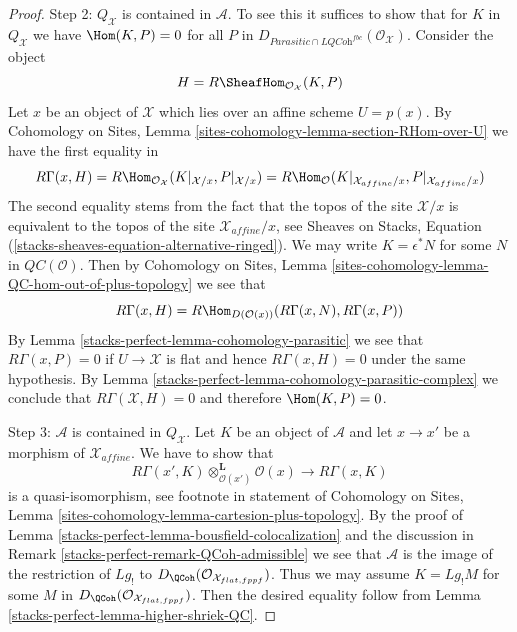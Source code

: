\begin{proof}
\medskip\noindent
Step 2: $Q_\mathcal{X}$ is contained in $\mathcal{A}$.
To see this it suffices to show that for $K$ in $Q_\mathcal{X}$
we have $\Hom(K, P) = 0$ for all $P$ in
$D_{\textit{Parasitic} \cap \textit{LQCoh}^{fbc}}(\mathcal{O}_\mathcal{X})$.
Consider the object
$$
H = R\SheafHom_{\mathcal{O}_\mathcal{X}}(K, P)
$$
Let $x$ be an object of $\mathcal{X}$ which lies over an affine scheme
$U = p(x)$. By Cohomology on Sites, Lemma
\ref{sites-cohomology-lemma-section-RHom-over-U} we have
the first equality in
$$
R\Gamma(x, H) =
R\Hom_{\mathcal{O}_\mathcal{X}}(K|_{\mathcal{X}/x}, P|_{\mathcal{X}/x}) =
R\Hom_{\mathcal{O}}(K|_{\mathcal{X}_{affine}/x}, P|_{\mathcal{X}_{affine}/x})
$$
The second equality stems from the fact that the topos of the site
$\mathcal{X}/x$ is equivalent to the topos of the site
$\mathcal{X}_{affine}/x$, see Sheaves on Stacks, Equation
(\ref{stacks-sheaves-equation-alternative-ringed}).
We may write $K = \epsilon^*N$ for some $N$ in $\mathit{QC}(\mathcal{O})$.
Then by Cohomology on Sites, Lemma
\ref{sites-cohomology-lemma-QC-hom-out-of-plus-topology} we see
that
$$
R\Gamma(x, H) =
R\Hom_{D(\mathcal{O}(x))}(R\Gamma(x, N), R\Gamma(x, P))
$$
By Lemma \ref{stacks-perfect-lemma-cohomology-parasitic} we see that $R\Gamma(x, P) = 0$
if $U \to \mathcal{X}$ is flat and hence $R\Gamma(x, H) = 0$ under the same
hypothesis. By Lemma \ref{stacks-perfect-lemma-cohomology-parasitic-complex} we conclude that
$R\Gamma(\mathcal{X}, H) = 0$ and therefore $\Hom(K, P) = 0$.

\medskip\noindent
Step 3: $\mathcal{A}$ is contained in $Q_\mathcal{X}$.
Let $K$ be an object of $\mathcal{A}$ and let $x \to x'$
be a morphism of $\mathcal{X}_{affine}$. We have to show that
$$
R\Gamma(x', K) \otimes_{\mathcal{O}(x')}^\mathbf{L} \mathcal{O}(x)
\longrightarrow
R\Gamma(x, K)
$$
is a quasi-isomorphism, see footnote in statement of Cohomology on Sites,
Lemma \ref{sites-cohomology-lemma-cartesion-plus-topology}.
By the proof of Lemma \ref{stacks-perfect-lemma-bousfield-colocalization}
and the discussion in Remark \ref{stacks-perfect-remark-QCoh-admissible}
we see that $\mathcal{A}$ is the image of the restriction
of $Lg_!$ to $D_\QCoh(\mathcal{O}_{\mathcal{X}_{flat, fppf}})$.
Thus we may assume $K = Lg_!M$ for some $M$ in
$D_\QCoh(\mathcal{O}_{\mathcal{X}_{flat, fppf}})$.
Then the desired equality follow from Lemma \ref{stacks-perfect-lemma-higher-shriek-QC}.
\end{proof}



